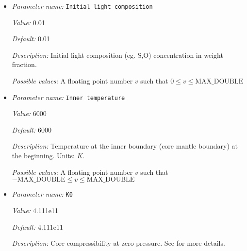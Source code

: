 \begin{itemize}
{\it Value:} 9.8


{\it Default:} 9.8


{\it Description:} Gravitation acceleration at CMB. Units: $m/s^2$.


{\it Possible values:} A floating point number $v$ such that $-\text{MAX\_DOUBLE} \leq v \leq \text{MAX\_DOUBLE}$
\item {\it Parameter name:} {\tt Initial light composition}
\label{parameters:Boundary temperature model/Dynamic core/Initial light composition}
\label{parameters:Boundary_20temperature_20model/Dynamic_20core/Initial_20light_20composition}


{\it Value:} 0.01


{\it Default:} 0.01


{\it Description:} Initial light composition (eg. S,O) concentration in weight fraction.


{\it Possible values:} A floating point number $v$ such that $0 \leq v \leq \text{MAX\_DOUBLE}$
\item {\it Parameter name:} {\tt Inner temperature}
\label{parameters:Boundary temperature model/Dynamic core/Inner temperature}
\label{parameters:Boundary_20temperature_20model/Dynamic_20core/Inner_20temperature}


{\it Value:} 6000


{\it Default:} 6000


{\it Description:} Temperature at the inner boundary (core mantle boundary) at the beginning. Units: $K$.


{\it Possible values:} A floating point number $v$ such that $-\text{MAX\_DOUBLE} \leq v \leq \text{MAX\_DOUBLE}$
\item {\it Parameter name:} {\tt K0}
\label{parameters:Boundary temperature model/Dynamic core/K0}
\label{parameters:Boundary_20temperature_20model/Dynamic_20core/K0}


{\it Value:} 4.111e11


{\it Default:} 4.111e11


{\it Description:} Core compressibility at zero pressure. See \cite{NPB+04} for more details.



\end{itemize}
